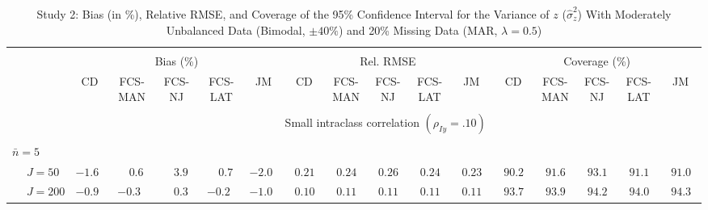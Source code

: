 \begin{sidewaystable}
\begin{threeparttable}
\setlength{\tabcolsep}{1.0pt}
\renewcommand{\arraystretch}{0.95}
\footnotesize
\caption{\small Study 2: Bias (in \%), Relative RMSE, and Coverage of the 95\% Confidence Interval for the Variance of $z$ ($\hat\sigma_z^2$) With Moderately Unbalanced Data (Bimodal, $\pm 40\%$) and 20\% Missing Data (MAR, $\lambda=0.5$)}
\begin{tabular}{llccccccccccccccc}
\hline\\[-1.8ex]
& & \multicolumn{5}{c}{Bias (\%)} & \multicolumn{5}{c}{Rel. RMSE} & \multicolumn{5}{c}{Coverage (\%)} \\ \cmidrule(r){3-7}\cmidrule(r){8-12}\cmidrule(r){13-17}
 &  & CD & \makecell{FCS-\\MAN} & \makecell{FCS-\\NJ} & \makecell{FCS-\\LAT} & JM & CD & \makecell{FCS-\\MAN} & \makecell{FCS-\\NJ} & \makecell{FCS-\\LAT} & JM & CD & \makecell{FCS-\\MAN} & \makecell{FCS-\\NJ} & \makecell{FCS-\\LAT} & \multicolumn{1}{c}{JM} \\ 
[0.4ex]\hline\\[-1.8ex]
& & \multicolumn{15}{c}{Small intraclass correlation $(\rho_{Iy}=.10)$} \\[0.6ex]\hline\\[-1.8ex]
\multicolumn{4}{l}{$\bar{n}=5$} \\  & \nopagebreak $\;J=50$  & ${-}1.6\phantom{0}$ & $\phantom{-}0.6\phantom{0}$ & $\phantom{-}3.9\phantom{0}$ & $\phantom{-}0.7\phantom{0}$ & ${-}2.0\phantom{0}$ & $\phantom{0}0.21\phantom{0}$ & $\phantom{0}0.24\phantom{0}$ & $\phantom{0}0.26\phantom{0}$ & $\phantom{0}0.24\phantom{0}$ & $\phantom{0}0.23\phantom{0}$ & $\phantom{0}90.2\phantom{0}$ & $\phantom{0}91.6\phantom{0}$ & $\phantom{0}93.1\phantom{0}$ & $\phantom{0}91.1\phantom{0}$ & $\phantom{0}91.0\phantom{0}$ \\
 & \nopagebreak $\;J=200$  & ${-}0.9\phantom{0}$ & ${-}0.3\phantom{0}$ & $\phantom{-}0.3\phantom{0}$ & ${-}0.2\phantom{0}$ & ${-}1.0\phantom{0}$ & $\phantom{0}0.10\phantom{0}$ & $\phantom{0}0.11\phantom{0}$ & $\phantom{0}0.11\phantom{0}$ & $\phantom{0}0.11\phantom{0}$ & $\phantom{0}0.11\phantom{0}$ & $\phantom{0}93.7\phantom{0}$ & $\phantom{0}93.9\phantom{0}$ & $\phantom{0}94.2\phantom{0}$ & $\phantom{0}94.0\phantom{0}$ & $\phantom{0}94.3\phantom{0}$ \\

\end{tabular}
\end{threeparttable}
\end{sidewaystable}
